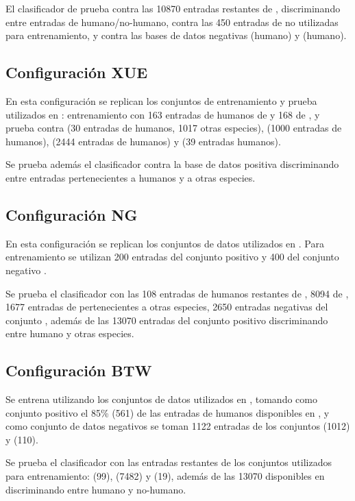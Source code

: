 \documentclass[12pt,bibliography=oldstyle,DIV=12,parskip=half-,titlepage]{scrartcl}
\begin{document}
El clasificador de prueba contra las 10870 entradas restantes de
, discriminando entre entradas de humano/no-humano,
contra las 450 entradas de  no utilizadas para
entrenamiento, y contra las bases de datos negativas 
(humano) y  (humano).
%
\subsection{Configuración XUE}
En esta configuración se replican los conjuntos de entrenamiento y
prueba utilizados en \cite{xue}: entrenamiento con 163 entradas de
humanos de  y 168 de , y prueba contra
 (30 entradas de humanos, 1017 otras especies),
 (1000 entradas de humanos),  (2444
entradas de humanos) y  (39 entradas humanos).

Se prueba además el clasificador contra la base de datos positiva
 discriminando entre entradas pertenecientes a humanos
y a otras especies.
%
\subsection{Configuración NG}
En esta configuración se replican los conjuntos de datos utilizados en
\cite{ng}.  Para entrenamiento se utilizan 200 entradas del conjunto
positivo  y 400 del conjunto negativo .

Se prueba el clasificador con las 108 entradas de humanos restantes de
, 8094 de , 1677 entradas de
 pertenecientes a otras especies, 2650 entradas
negativas del conjunto , además de las 13070
entradas del conjunto positivo  discriminando entre
humano y otras especies.
%
\subsection{Configuración BTW}
Se entrena utilizando los conjuntos de datos utilizados en
\cite{batuwita}, tomando como conjunto positivo el 85\% (561) de las
entradas de humanos disponibles en , y como conjunto de
datos negativos se toman 1122 entradas de los conjuntos 
(1012) y  (110).

Se prueba el clasificador con las entradas restantes de los conjuntos
utilizados para entrenamiento:  (99), 
(7482) y  (19), además de las 13070 disponibles en
 discriminando entre humano y no-humano.
%
\end{document}
